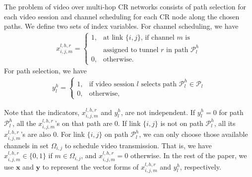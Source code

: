 \documentclass[12pt,onecolumn,draftclsnofoot]{IEEEtran} %
\begin{document}
The problem of video over multi-hop CR networks consists of path selection for each video session and channel scheduling for each CR node along the chosen paths.  We define two sets of index variables.  For channel scheduling, we have
\begin{eqnarray}\label{eq:DefX1}
  x_{i,j,m}^{l,h,r}=\left\{
    \begin{array}{ll}
      1, & \mbox{at link $\{i,j\}$, if channel $m$ is} \\
         & \mbox{assigned to tunnel $r$ in path $\mathcal{P}_l^h$} \\
      0, & \mbox{otherwise.}
    \end{array}\right.
\end{eqnarray}
For path selection, we have
\begin{eqnarray}\label{eq:DefY}
	y_l^h=\left\{
	\begin{array}{ll}
		1, & \mbox{if video session $l$ selects path $\mathcal{P}_l^h \in \mathcal{P}_l$} \\
		0, & \mbox{otherwise},
	\end{array}\right.
\end{eqnarray}

Note that the indicators, $x_{i,j,m}^{l,h,r}$ and $y_l^h$, are not independent.  If $y_l^h=0$ for path $\mathcal{P}_l^h$, all the $x_{i,j,m}^{l,h,r}$'s on that path are $0$.  If link $\{i,j\}$ is not on path $\mathcal{P}_l^h$, all its $x_{i,j,m}^{l,h,r}$'s are also $0$.   For link $\{i,j\}$ on path $\mathcal{P}_l^h$, we can only choose those available channels in set $\Omega_{i,j}$ to schedule video transmission. That is, we have $x_{i,j,m}^{l,h,r} \in \{0, 1\}$ if $m \in \Omega_{i,j}$, and $x_{i,j,m}^{l,h,r} = 0$ otherwise.  In the rest of the paper, we use $\mathbf{x}$ and $\mathbf{y}$ to represent the vector forms of $x_{i,j,m}^{l,h,r}$ and $y_l^h$, respectively.
\end{document}

